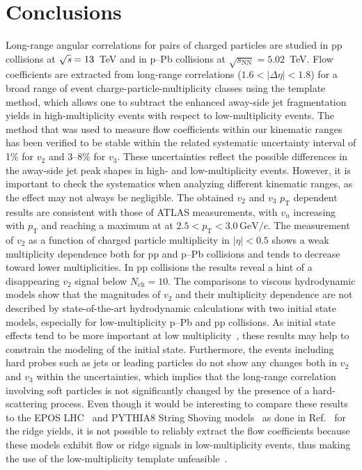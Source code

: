 
\section{Conclusions}
\label{sec:summary}
Long-range angular correlations for pairs of charged particles are studied in pp collisions at ${\sqrt{{\textit s}}}=13$~TeV and in p--Pb collisions at $\sqrt{s_\mathrm{NN}} = 5.02$~TeV. Flow coefficients are extracted from long-range correlations ($1.6 <|\Delta\eta| < 1.8$) for a broad range of event charge-particle-multiplicity classes using the template method, which allows one to subtract the enhanced away-side jet fragmentation yields in high-multiplicity events with respect to low-multiplicity events. The method that was used to measure flow coefficients within our kinematic ranges has been verified to be stable within the related systematic uncertainty interval of 1\% for $v_{2}$ and 3--8\% for $v_{3}$. These uncertainties reflect the possible differences in the away-side jet peak shapes in high- and low-multiplicity events. However, it is important to check the systematics when analyzing different kinematic ranges, as the effect may not always be negligible.
The obtained $v_2$ and $v_3$ $p_\mathrm{T}$ dependent results are consistent with those of ATLAS measurements, with $v_n$ increasing with $p_\mathrm{T}$ and reaching a maximum at at $2.5<p_\mathrm{T}<3.0\,\mathrm{GeV}/c$. 
The measurement of $v_2$ as a function of charged particle multiplicity in $|\eta|<0.5$ shows a weak multiplicity dependence both for pp and p--Pb collisions and tends to decrease toward lower multiplicities. In pp collisions the results reveal a hint of a disappearing $v_2$ signal below $N_{\mathrm{ch}} = 10$. 
The comparisons to viscous hydrodynamic models show that the magnitudes of $v_2$ and their multiplicity dependence are not described by state-of-the-art hydrodynamic calculations with two initial state models, especially for low-multiplicity p--Pb and pp collisions. As initial state effects tend to be more important at low multiplicity~\cite{Greif:2017bnr,Moreland:2018gsh}, these results may help to constrain the modeling of the initial state.
Furthermore, the events including hard probes such as jets or leading particles do not show any changes both in $v_2$ and $v_3$ within the uncertainties, which implies that the long-range correlation involving soft particles is not significantly changed by the presence of a hard-scattering process. Even though it would be interesting to compare these results to the EPOS LHC~\cite{Pierog:2013ria} and PYTHIA8 String Shoving models~\cite{Bierlich:2017vhg,Bierlich:2019ixq} as done in Ref.~\cite{ALICE:2012eyl} for the ridge yields, it is not possible to reliably extract the flow coefficients because these models exhibit flow or ridge signals in low-multiplicity events, thus making the use of the low-multiplicity template unfeasible~\cite{Ji:2023eqn}.

